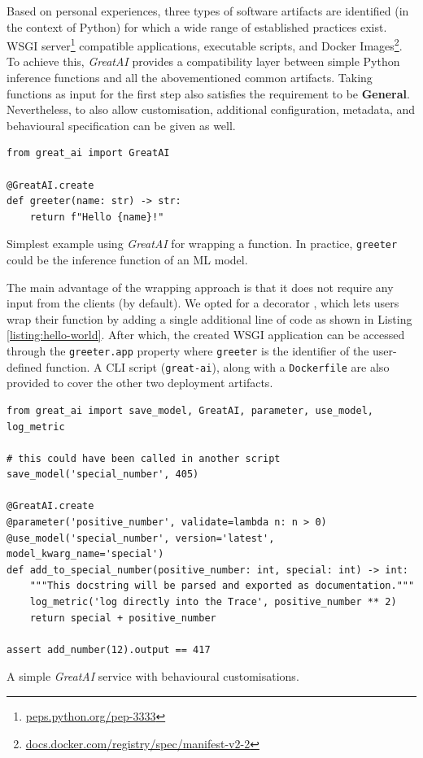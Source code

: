 Based on personal experiences, three types of software artifacts are identified (in the context of Python) for which a wide range of established practices exist. WSGI server\footnote{\href{https://peps.python.org/pep-3333/}{peps.python.org/pep-3333}} compatible applications, executable scripts, and Docker Images\footnote{\href{https://docs.docker.com/registry/spec/manifest-v2-2/}{docs.docker.com/registry/spec/manifest-v2-2}}. To achieve this, \textit{GreatAI} provides a compatibility layer between simple Python inference functions and all the abovementioned common artifacts. Taking functions as input for the first step also satisfies the requirement to be \textbf{General}. Nevertheless, to also allow customisation, additional configuration, metadata, and behavioural specification can be given as well.

\begin{listing}[!ht]
\begin{verbatim}
from great_ai import GreatAI

@GreatAI.create
def greeter(name: str) -> str:
    return f"Hello {name}!"
\end{verbatim}
\captionsetup{width=.9\linewidth}
\caption{Simplest example using \textit{GreatAI} for wrapping a function. In practice, \texttt{greeter} could be the inference function of an ML model.}
\label{listing:hello-world}
\end{listing}

The main advantage of the wrapping approach is that it does not require any input from the clients (by default). We opted for a decorator \cite{gamma1995design}, which lets users wrap their function by adding a single additional line of code as shown in Listing \ref{listing:hello-world}. After which, the created WSGI application can be accessed through the \texttt{greeter.app} property where \texttt{greeter} is the identifier of the user-defined function. A CLI script (\texttt{great-ai}), along with a \texttt{Dockerfile} are also provided to cover the other two deployment artifacts.

\begin{listing}[!ht]
\begin{verbatim}
from great_ai import save_model, GreatAI, parameter, use_model, log_metric

# this could have been called in another script
save_model('special_number', 405)

@GreatAI.create
@parameter('positive_number', validate=lambda n: n > 0)
@use_model('special_number', version='latest', model_kwarg_name='special')
def add_to_special_number(positive_number: int, special: int) -> int:
    """This docstring will be parsed and exported as documentation."""
    log_metric('log directly into the Trace', positive_number ** 2)
    return special + positive_number

assert add_number(12).output == 417
\end{verbatim}
\captionsetup{width=.9\linewidth,position=top,skip=-20pt}
\caption{A simple \textit{GreatAI} service with behavioural customisations.}
\label{listing:complex}
\end{listing}

